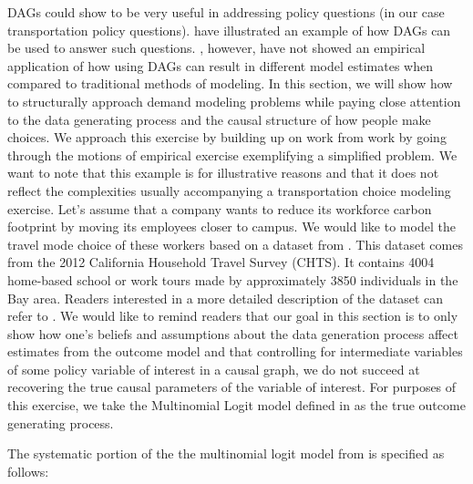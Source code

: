 DAGs could show to be very useful in addressing policy questions (in our case transportation policy questions).
\citet{brathwaite_2018_causal} have illustrated an example of how DAGs can be used to answer such questions.
\citet{brathwaite_2018_causal}, however, have not showed an empirical application of how using DAGs can result in
different model estimates when compared to traditional methods of modeling.
In this section, we will show how to structurally approach demand modeling problems while paying close
attention to the data generating process and the causal structure of how people make choices.
We approach this exercise by building up on work from \citet{brathwaite_2018_causal} work by going through
the motions of empirical exercise exemplifying a simplified problem.
We want to note that this example is for illustrative reasons and that it does not reflect the complexities
usually accompanying a transportation choice modeling exercise.
Let's assume that a company wants to reduce its workforce carbon footprint by moving its employees closer to campus.
We would like to model the travel mode choice of these workers based on a dataset from \citet{brathwaite_asymmetric}.
This dataset comes from the 2012 California Household Travel Survey (CHTS).
It contains 4004 home-based school or work tours made by approximately 3850 individuals in the Bay area.
Readers interested in a more detailed description of the dataset can refer to \citet{brathwaite_asymmetric}.
We would like to remind readers that our goal in this section is to only show how one's beliefs and assumptions about the data generation
process affect estimates from the outcome model and that controlling for intermediate variables of
some policy variable of interest in a causal graph,
we do not succeed at recovering the true causal parameters of the variable of interest.
For purposes of this exercise, we take the Multinomial Logit model defined in \citet{brathwaite_asymmetric} as the true outcome generating process.

The systematic portion of the the multinomial logit model from \citet{brathwaite_asymmetric} is specified as follows:

